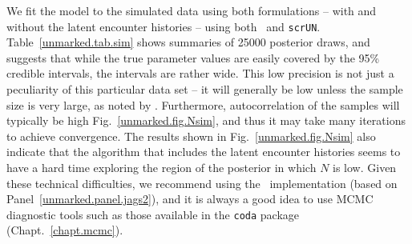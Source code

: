 We fit the model to the simulated data using both formulations -- with and without
the latent encounter histories -- using both
\jags~and \verb+scrUN+.
Table~\ref{unmarked.tab.sim} shows %
summaries of 25000 posterior draws, and suggests that while the
true parameter values are easily covered by the 95\% credible
intervals, the intervals are rather wide. %
This low precision is not just a
peculiarity of this particular data set -- it will generally be low
unless the sample size is very large,
as noted by \citet{chandler_royle:2012}. Furthermore,
autocorrelation of the samples will typically be high
Fig.~\ref{unmarked.fig.Nsim},
and thus it may take many iterations to achieve convergence.
The results shown in Fig.~\ref{unmarked.fig.Nsim} also indicate that
the algorithm that includes the latent encounter histories
seems to have a hard time exploring the region of the posterior in
which $N$ is low. Given these technical difficulties, we recommend
using the \jags~implementation (based on
Panel~\ref{unmarked.panel.jags2}), and it is always a good idea to use
MCMC diagnostic tools such as those available in the \texttt{coda}
package (Chapt.~\ref{chapt.mcmc}).

